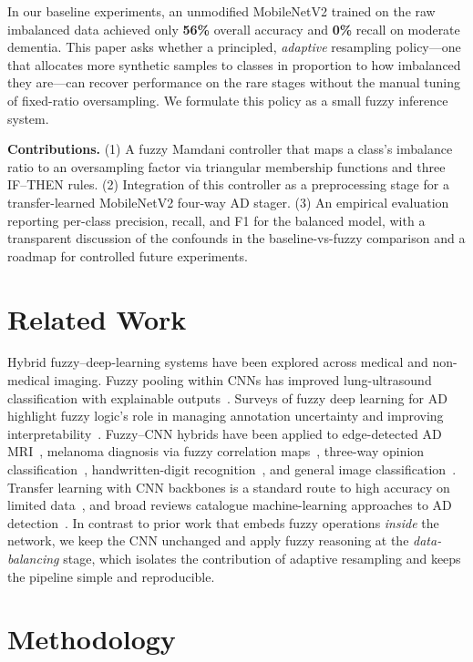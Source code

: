 \documentclass[journal]{IEEEtran}
\begin{document}
In our baseline experiments, an unmodified MobileNetV2 trained on the raw
imbalanced data achieved only \textbf{56\%} overall accuracy and \textbf{0\%}
recall on moderate dementia. This paper asks
whether a principled, \emph{adaptive} resampling policy---one that allocates more
synthetic samples to classes in proportion to how imbalanced they are---can
recover performance on the rare stages without the manual tuning of fixed-ratio
oversampling. We formulate this policy as a small fuzzy inference system.

\textbf{Contributions.}
(1) A fuzzy Mamdani controller that maps a class's imbalance ratio to an
oversampling factor via triangular membership functions and three IF--THEN rules.
(2) Integration of this controller as a preprocessing stage for a transfer-learned
MobileNetV2 four-way AD stager.
(3) An empirical evaluation reporting per-class precision, recall, and F1 for the
balanced model, with a transparent discussion of the confounds in the
baseline-vs-fuzzy comparison and a roadmap for controlled future experiments.

\section{Related Work}
Hybrid fuzzy--deep-learning systems have been explored across medical and
non-medical imaging. Fuzzy pooling within CNNs has improved lung-ultrasound
classification with explainable outputs~\cite{ref2}. Surveys of fuzzy deep
learning for AD highlight fuzzy logic's role in managing annotation uncertainty
and improving interpretability~\cite{ref3,ref8}. Fuzzy--CNN hybrids have been
applied to edge-detected AD MRI~\cite{ref1}, melanoma diagnosis via fuzzy
correlation maps~\cite{ref10}, three-way opinion classification~\cite{ref4},
handwritten-digit recognition~\cite{ref6}, and general image
classification~\cite{ref7}. Transfer learning with CNN backbones is a standard
route to high accuracy on limited data~\cite{ref9}, and broad reviews catalogue
machine-learning approaches to AD detection~\cite{ref5}. In contrast to prior
work that embeds fuzzy operations \emph{inside} the network, we keep the CNN
unchanged and apply fuzzy reasoning at the \emph{data-balancing} stage, which
isolates the contribution of adaptive resampling and keeps the pipeline simple
and reproducible.

\section{Methodology}
\end{document}
